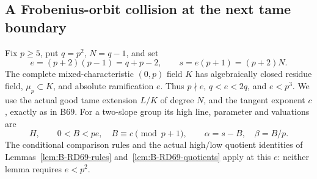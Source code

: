 \subsection{A Frobenius-orbit collision at the next tame boundary}

Fix \(p\ge5\), put \(q=p^2\), \(N=q-1\), and set
\[
 e=(p+2)(p-1)=q+p-2,\qquad s=e(p+1)=(p+2)N.
 \tag{B-RD70.1}
\]
The complete mixed-characteristic \((0,p)\) field \(K\) has
algebraically closed residue field, \(\mu_p\subset K\), and
absolute ramification \(e\). Thus \(p\nmid e\),
\(q<e<2q\), and \(e<p^3\).
We use the actual good tame extension \(L/K\) of degree \(N\),
and the tangent exponent \(c\), exactly as in B69.
For a two-slope group its high line, parameter and valuations are
\[
 H,\qquad 0<B<pe,\quad B\equiv c\pmod{p+1},\qquad
 \alpha=s-B,\quad\beta=B/p .
 \tag{B-RD70.2}
\]
The conditional comparison rules and the actual high/low quotient
identities of Lemmas~\ref{lem:B-RD69-rules}
and~\ref{lem:B-RD69-quotients} apply at this \(e\): neither
lemma requires \(e<p^2\).

